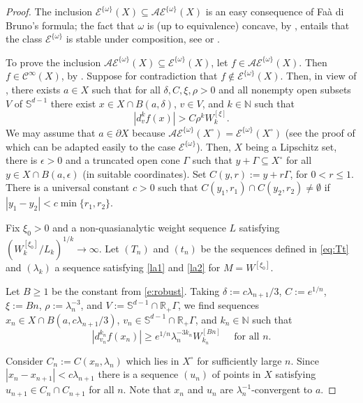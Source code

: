 \documentclass[10pt, reqno]{amsart}
\theoremstyle{plain}
\theoremstyle{definition}
\numberwithin{equation}{section}
\def\de{\delta}
\def\ep{\epsilon}
\def\la{\lambda}
\def\rh{\rho}
\def\om{\omega}
\def\Ga{\Gamma}
\def\N{\mathbb{N}}
\def\R{\mathbb{R}}
\def\cC{\mathcal{C}}
\def\cE{\mathcal{E}}
\def\p{\partial}
\renewcommand{\o}{\circ}
\def\AU{\mathcal{AE}^{\{\omega\}}}
\begin{document}
\begin{proof}
    The inclusion $\cE^{\{\om\}}(X) \subseteq \AU(X)$ is an easy consequence of Fa\`a di Bruno's formula;
    the fact that $\om$ is (up to equivalence) concave, by , 
    entails that the class $\cE^{\{\om\}}$ is stable under composition, 
    see \cite{Rainer:2021aa} or \cite{RainerSchindl12}.

    To prove the inclusion $\AU(X) \subseteq \cE^{\{\om\}}(X)$,
    let $f \in \AU(X)$. Then $f \in \cC^\infty(X)$, by .
    Suppose for contradiction that $f \not\in \cE^{\{\om\}}(X)$. 
    Then, in view of \cite[Proposition 7.2]{Rainer18}, there exists $a \in X$ such that for all 
    $\de,C,\xi, \rh>0$ and all nonempty open subsets $V$ of $\mathbb S^{d-1}$  
    there exist $x \in X \cap B(a,\de)$, $v \in V$, and $k \in \N$
    such that
    \begin{equation} \label{e:contra}
        |d_v^k f(x)| > C \rh^k W^{[\xi]}_k. 
    \end{equation}
    We may assume that $a \in \p X$ because $\AU(X^\o) = \cE^{\{\om\}}(X^\o)$ (see \cite[Theorem 3.9]{KMRc} 
    the proof of which can be adapted easily to the case $\cE^{\{\om\}}$).
    Then, $X$ being a Lipschitz set, there is $\ep>0$ and a truncated open cone $\Ga$ 
    such that $y+\Ga \subseteq X^\o$ for all $y \in X \cap B(a,\ep)$ (in suitable coordinates).
    Set $C(y,r):= y + r \Ga$, for $0<r\le 1$.
    There is a universal constant $c>0$ such that $C(y_1,r_1)\cap C(y_2,r_2) \ne \emptyset$ if $|y_1-y_2| < c \min\{r_1,r_2\}$.

    Fix $\xi_0>0$  
    and a non-quasianalytic weight sequence $L$ satisfying  $(W^{[\xi_0]}_k/L_k)^{1/k} \to \infty$.
    Let $(T_n)$ and $(t_n)$ be the sequences defined in \eqref{eq:Tt} and
    $(\la_k)$ a sequence satisfying \eqref{la1} and \eqref{la2} for $M=W^{[\xi_0]}$.

    Let $B\ge 1$ be the constant from \eqref{e:robust}. 
    Taking $\de:= c \la_{n+1}/3$, $C := e^{1/n}$, $\xi := Bn$, $\rh := \la_n^{-3}$,
    and $V := \mathbb S^{d-1} \cap \R_+ \Ga$,
    we find sequences $x_n \in X \cap B(a,c\la_{n+1}/3)$, $v_n \in \mathbb S^{d-1} \cap \R_+ \Ga$, and $k_n \in \N$ such that
    \begin{equation} \label{e:contra2}
        |d_{v_n}^{k_n}f(x_n)| \ge e^{1/n} \la_n^{-3k_n} W^{[Bn]}_{k_n}\quad \text{ for all } n.
    \end{equation}

    Consider $C_n:= C(x_n,\la_n)$ which lies in $X^\o$ for sufficiently large $n$.
    Since $|x_n -x_{n+1}| < c \la_{n+1}$ there is a sequence $(u_n)$ of points in $X$ 
    satisfying $u_{n+1} \in C_n \cap C_{n+1}$ for all $n$.
    Note that $x_n$ and $u_n$ are $\la_n^{-1}$-convergent to $a$.


\end{proof}
\end{document}
